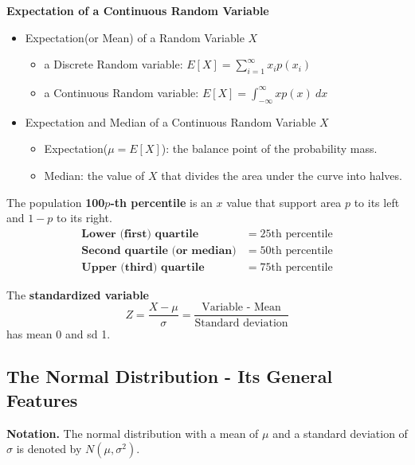 \documentclass[12pt,a4paper]{article}
\begin{document}
\begin{tcolorbox}[colback=white]
\begin{center}
	\textbf{Expectation of a Continuous Random Variable}
\end{center}\begin{itemize}
\item Expectation(or Mean) of a Random Variable $X$\begin{itemize}
	\item a Discrete Random variable: $E[X]=\sum_{i=1}^\infty x_ip(x_i)$
	\item a Continuous Random variable: $E[X]=\int_{-\infty}^\infty xp(x)\ dx$
\end{itemize}
\item Expectation and Median of a Continuous Random Variable $X$\begin{itemize}
	\item Expectation($\mu=E[X]$): the balance point of the probability mass.
	\item Median: the value of $X$ that divides the area under the curve into halves.
\end{itemize}
\end{itemize}
\end{tcolorbox}
\begin{tcolorbox}[colback=white]
	The population \textbf{100$p$-th percentile} is an $x$ value that support area $p$ to its left and $1-p$ to its right. \begin{align*}
	\textbf{Lower (first) quartile} &= 25\text{th percentile} \\
	\textbf{Second quartile (or median)} &= 50\text{th percentile} \\
	\textbf{Upper (third) quartile} &= 75\text{th percentile}
	\end{align*}
\end{tcolorbox}

\begin{tcolorbox}[colback=white]
	The \textbf{standardized variable} \[
	Z = \frac{X-\mu}{\sigma}=\frac{\text{Variable - Mean}}{\text{Standard deviation}}
	\] has mean $0$ and sd 1.
\end{tcolorbox}

\subsection{The Normal Distribution - Its General Features}

\begin{tcolorbox}[colback=white]
	\textbf{Notation.} The normal distribution with a mean of $\mu$ and a standard deviation of $\sigma$ is denoted by $N(\mu,\sigma^2)$.
\end{tcolorbox}
\end{document}
